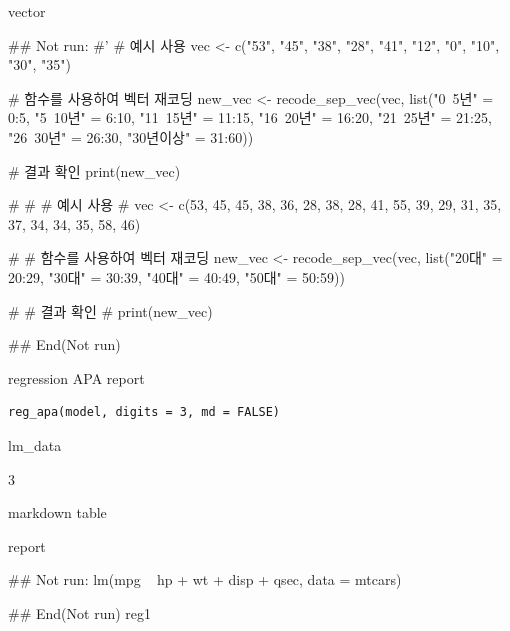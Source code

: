 \documentclass[a4paper]{book}
\begin{document}
%
\begin{Value}
vector
\end{Value}
%
\begin{Examples}
\begin{ExampleCode}
## Not run: 
#'
# 예시 사용
vec <- c("53", "45", "38", "28", "41", "12", "0", "10", "30", "35")

# 함수를 사용하여 벡터 재코딩
new_vec <- recode_sep_vec(vec, list("0~5년" = 0:5,
                                    "5~10년" = 6:10,
                                    "11~15년" = 11:15,
                                    "16~20년" = 16:20,
                                    "21~25년" = 21:25,
                                    "26~30년" = 26:30,
                                    "30년이상" = 31:60))

# 결과 확인
print(new_vec)

# # # 예시 사용
# vec <- c(53, 45, 45, 38, 36, 28, 38, 28, 41, 55, 39, 29, 31, 35, 37, 34, 34, 35, 58, 46)

# # 함수를 사용하여 벡터 재코딩
new_vec <- recode_sep_vec(vec, list("20대" = 20:29, "30대" = 30:39, "40대" = 40:49, "50대" = 50:59))

# # 결과 확인
# print(new_vec)

## End(Not run)


\end{ExampleCode}
\end{Examples}
%
\begin{Description}
regression APA report
\end{Description}
%
\begin{Usage}
\begin{verbatim}
reg_apa(model, digits = 3, md = FALSE)
\end{verbatim}
\end{Usage}
%
\begin{Arguments}
\begin{ldescription}
\item[\code{model}] lm\_data

\item[\code{digits}] 3

\item[\code{md}] markdown table
\end{ldescription}
\end{Arguments}
%
\begin{Value}
report
\end{Value}
%
\begin{Examples}
\begin{ExampleCode}
## Not run: 
lm(mpg ~ hp + wt + disp + qsec, data = mtcars) %

## End(Not run)
reg1
\end{ExampleCode}
\end{Examples}
\end{document}
